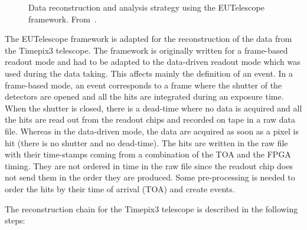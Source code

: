 \begin{figure}[htbp]
  \centering
  \caption{Data reconstruction and analysis strategy using the
    EUTelescope framework. From~\cite{Jansen:2016bkd}.}
  \label{fig:EUTelescope_EUDET_pipeline}
\end{figure}

The EUTelescope framework is adapted for the reconstruction of the
data from the Timepix3 telescope. The framework is originally written
for a frame-based readout mode and had to be adapted to the
data-driven readout mode which was used during the data taking. This
affects mainly the definition of an event. In a frame-based mode, an
event corresponds to a frame where the shutter of the detectors are
opened and all the hits are integrated during an exposure time. When
the shutter is closed, there is a dead-time where no data is acquired
and all the hits are read out from the readout chips and recorded on
tape in a raw data file. Whereas in the data-driven mode, the data are
acquired as soon as a pixel is hit (there is no shutter and no
dead-time). The hits are written in the raw file with their time-stamps
coming from a combination of the TOA and the FPGA timing. They are not
ordered in time in the raw file since the readout chip does not send
them in the order they are produced. Some pre-processing is needed to
order the hits by their time of arrival (TOA) and create events.

The reconstruction chain for the Timepix3 telescope is described in
the following steps:

